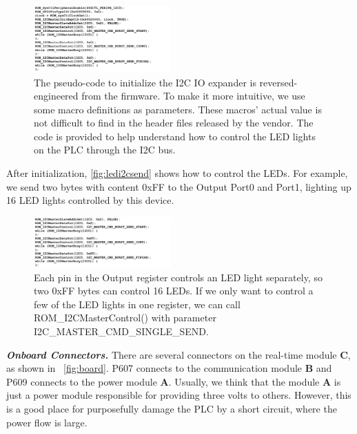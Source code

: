 \begin{figure}[th]
	\includegraphics[width=0.47\textwidth]{figures/ledi2cinit}
	\centering
	\caption{The pseudo-code to initialize the I2C IO expander is reversed-engineered from the firmware. To make it more intuitive, we use some macro definitions as parameters. These macros' actual value is not difficult to find in the header files released by the vendor. The code is provided to help understand how to control the LED lights on the PLC through the I2C bus.}
	\label{fig:ledi2cinit}
\end{figure}



After initialization, \autoref{fig:ledi2csend} shows how to control the LEDs. For example, we send two bytes with content 0xFF to the Output Port0 and Port1, lighting up 16 LED lights controlled by this device.


\begin{figure}[th]
	\includegraphics[width=0.47\textwidth]{figures/ledi2csend}
	\centering
	\caption{Each pin in the Output register controls an LED light separately, so two 0xFF bytes can control 16 LEDs. If we only want to control a few of the LED lights in one register, we can call ROM\_I2CMasterControl() with parameter I2C\_MASTER\_CMD\_SINGLE\_SEND.}
	\label{fig:ledi2csend}
\end{figure}






\textbf{\textit{Onboard Connectors.}} There are several connectors on the real-time module \textbf{C}, as shown in ~\autoref{fig:board}. P607 connects to the communication module \textbf{B} and P609 connects to the power module \textbf{A}. Usually, we think that the module \textbf{A} is just a power module responsible for providing three volts to others. However, this is a good place for purposefully damage the PLC by a short circuit, where the power flow is large.

